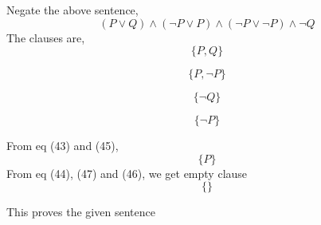 \documentclass[11pt, a4paper]{report}
\begin{document}
\begin{enumerate}
\begin{itemize}
Negate the above sentence,
\begin{equation}
(P \vee Q) \wedge (\neg P \vee P )\wedge (\neg P \vee \neg P) \wedge \neg Q
\end{equation}
The clauses are,
\begin{equation}
\{  P, Q \}
\end{equation}

\begin{equation}
\{ P, \neg P \}
\end{equation} 

\begin{equation}
\{ \neg Q \}
\end{equation}

\begin{equation}
\{ \neg P \}
\end{equation}

From eq (43) and (45),
\begin{equation}
\{  P \}
\end{equation}
From eq (44), (47) and (46), we get empty clause
\begin{equation}
\{ \}
\end{equation}

This proves the given sentence
\end{itemize}
\end{enumerate}
\end{document}
